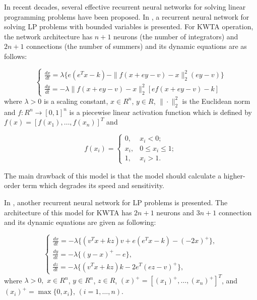 \documentclass[conference]{IEEEtran}
\begin{document}
In recent decades, several effective recurrent neural networks for
solving linear programming problems have been proposed. In
\cite{cit:24}, a recurrent neural network for solving LP problems
with bounded variables is presented. For KWTA operation, the network
architecture has $n+1$ neurons (the number of integrators) and
$2n+1$ connections (the number of summers) and its dynamic equations
are as follows:

\begin{equation}
\left\{\begin{array}{l} \frac{dx}{dt}=\lambda \{ e(e^{T}x-k)-\|f(x+ey-v)-x\|_{2}^{2}(ey-v)\} \\
\frac{dy}{dt}=-\lambda\|f(x+ey-v)-x\|_{2}^{2}[ef(x+ey-v)-k]
\end{array} \right.
\label{eq:KWTA1}
\end{equation}
where $\lambda >0$ is a scaling constant, $x\in R^{n}$, $y\in R$,
$\|\cdot\|_{2}^{2}$ is the Euclidean norm and $f :R^{n}\to
[0,1]^{n}$ is a piecewise linear activation function which is
defined by $f (x)=[f(x_1),\ldots,f(x_n)]^{T}$ and

\begin{equation}
f(x_i)= \left\{ \begin{array}{ll} 0, & x_i <0;\\
x_i, & 0\le x_i\le 1;\\
1, & x_i >1.
\end{array}\right.
\end{equation}

The main drawback of this model is that the model should calculate
a higher-order term which degrades its speed and sensitivity.

In \cite{cit:25}, another recurrent neural network for LP problems
is presented. The architecture of this model for KWTA has $2n+1$
neurons and $3n+1$ connection and its dynamic equations are given as
following:

\begin{equation}
\left\{\begin{array}{l} \frac{dx}{dt}=-\lambda\{(v^{T}x+kz)v+e(e^{T}x-k)-(-2x)^{+}\}, \\
\frac{dy}{dt}=-\lambda \{(y-x)^{+}-e\}, \\
\frac{dz}{dt}=-\lambda\{(v^{T}x+kz)k-2e^{T}(ez-v)^{+}\},
\end{array} \right.
\label{eq:KWTA2}
\end{equation}
where $\lambda >0,$ $x\in R^{n}$, $y\in R^{n}$, $z\in R$,
$(x)^{+}=[(x_1)^{+},\ldots,(x_n)^{+}]^{T}$, and
$(x_i)^{+}=\max\{0,x_i\}$, $(i=1,\ldots,n)$.
\end{document}
